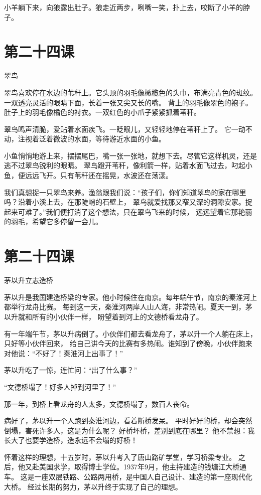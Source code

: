 \documentclass[12pt,UTF8]{ctexbook}
\begin{document}
小羊躺下来，向狼露出肚子。狼走近两步，咧嘴一笑，扑上去，咬断了小羊的脖子。

\section{第二十四课}

翠鸟

翠鸟喜欢停在水边的苇秆上。它头顶的羽毛像橄榄色的头巾，布满亮青色的斑纹。
一双透亮灵活的眼睛下面，长着一张又尖又长的嘴。
背上的羽毛像翠色的袍子。肚子上的羽毛像橘色的衬衣。一双红色的小爪子紧紧抓着苇秆。

翠鸟鸣声清脆，爱贴着水面疾飞。一眨眼儿，又轻轻地停在苇秆上了。
它一动不动，注视着泛着微波的水面，等待游近水面的小鱼。

小鱼悄悄地游上来，摆摆尾巴，嘴一张一张地，就想下去。尽管它这样机灵，还是逃不过翠鸟锐利的眼睛。
翠鸟蹬开苇秆，像利箭一样，贴着水面飞过去，叼起小鱼，便远远飞开。只有苇秆还在摇晃，水波还在荡漾。

我们真想捉一只翠鸟来养。渔翁跟我们说：“孩子们，你们知道翠鸟的家在哪里吗？沿着小溪上去，在那陡峭的石壁上，
翠鸟就爱找那又窄又深的洞隙安家。捉起来可难了。”我们便打消了这个想法，只在翠鸟飞来的时候，
远远望着它那艳丽的羽毛，希望它多停留一会儿。

\section{第二十四课}

茅以升立志造桥

茅以升是我国建造桥梁的专家。他小时候住在南京。每年端午节，南京的秦淮河上都举行龙舟比赛。
每到这一天，秦淮河两岸人山人海，非常热闹。夏天一到，茅以升就和所有的小伙伴一样，
盼望着到河上的文德桥看龙舟了。

有一年端午节，茅以升病倒了。小伙伴们都去看龙舟了，茅以升一个人躺在床上，只好等小伙伴回来，
给自己讲今天的比赛有多热闹。谁知到了傍晚，小伙伴跑来对他说：“不好了！秦淮河上出事了！”

茅以升吃了一惊，连忙问：“出了什么事？”

“文德桥塌了！好多人掉到河里了！”

那一年，到桥上看龙舟的人太多，文德桥塌了，数百人丧命。

病好了，茅以升一个人跑到秦淮河边，看着断桥发呆。
平时好好的桥，却会突然倒塌，害死许多人，这是为什么呢？
好桥坏桥，差别到底在哪里？
他不禁想：我长大了也要学造桥，造永远不会塌的好桥！

怀着这样的理想，十五岁时，茅以升考入了唐山路矿学堂，学习桥梁专业。
之后，他又赴美国求学，取得博士学位。1937年9月，他主持建造的钱塘江大桥通车。
这是一座双层铁路、公路两用桥，是中国人自己设计、建造的第一座现代化大桥。
经过长期的努力，茅以升终于实现了自己的理想。
\end{document}
